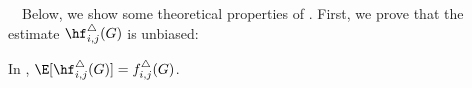 \smallskip
{}~~Below, we show some theoretical properties of \AlgWSLE{}. 
% 
First, we prove that 
the estimate $\hf_{i,j}^\triangle(G)$ 
is unbiased: 
\begin{theorem}
\label{chap3-thm:unbiased_I}
In \AlgWSLE{}, $\E[\hf_{i,j}^\triangle(G)] = f_{i,j}^\triangle(G)$. 
\end{theorem}

